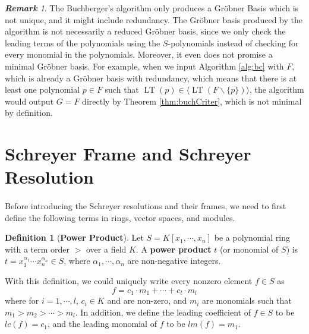 \documentclass{article}
\newcommand{\lt}{\ensuremath{\operatorname{LT}}}
\theoremstyle{definition}
\newtheorem{definition}{Definition}[section]
\theoremstyle{remark}
\newtheorem*{remark}{\textbf{Remark}}
\theoremstyle{example}
\begin{document}
\begin{remark}
    The Buchberger's algorithm only produces a Gröbner Basis which is not unique, and it might include redundancy. The Gröbner basis produced by the algorithm is not necessarily a reduced Gröbner basis, since we only check the leading terms of the polynomials using the $S$-polynomials instead of checking for every monomial in the polynomials. Moreover, it even does not promise a minimal Gröbner basis. For example, when we input Algorithm \ref{alg:bc} with $F$, which is already a Gröbner basis with redundancy, which means that there is at least one polynomial $p \in F$ such that $\lt(p) \in \langle \lt(F\backslash \{p\}) \rangle$, the algorithm would output $G = F$ directly by Theorem \ref{thm:buchCriter}, which is not minimal by definition.
\end{remark}

\section{Schreyer Frame and Schreyer Resolution}

\paragraph{}

Before introducing the Schreyer resolutions and their frames, we need to first define the following terms in rings, vector spaces, and modules.

\begin{definition}[\textbf{Power Product}]
    Let $S = K[x_1,\cdots, x_n]$ be a polynomial ring with a term order $>$ over a field $K$. A \textbf{power product} $t$ (or monomial of $S$) is $t = x_1^{\alpha_1}\cdots x_n^{\alpha_n} \in S$, where $\alpha_1, \cdots, \alpha_n$ are non-negative integers.
\end{definition}

With this definition, we could uniquely write every nonzero element $f \in S$ as 
\begin{equation}
    f = c_1\cdot m_1 + \cdots + c_l\cdot m_l
\end{equation}
where for $i = 1, \cdots, l$, $c_i \in K$ and are non-zero, and $m_i$ are monomials such that $m_1 > m_2 > \cdots > m_l$. In addition, we define the leading coefficient of $f \in S$ to be $lc(f) = c_1$, and the leading monomial of $f$ to be $lm(f) = m_1$.

\paragraph{}
\end{document}
